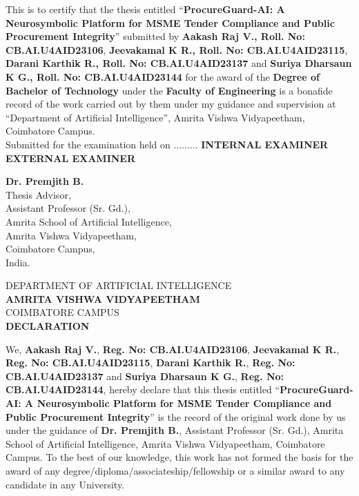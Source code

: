 \documentclass[a4paper, 12pt]{report}
\theoremstyle{definition}
\begin{document}
	\vspace*{.8cm}
	\noindent This is to certify that the thesis entitled \enquote{\textbf{ProcureGuard-AI: A Neurosymbolic Platform for MSME Tender Compliance and Public Procurement Integrity}} submitted by \textbf{Aakash Raj V., Roll. No: CB.AI.U4AID23106}, \textbf{Jeevakamal K R., Roll. No: CB.AI.U4AID23115}, \textbf{Darani Karthik R., Roll. No: CB.AI.U4AID23137} and \textbf{Suriya Dharsaun K G., Roll. No: CB.AI.U4AID23144} for the award of the \textbf{Degree of Bachelor of Technology} under the \textbf{Faculty of Engineering} is a bonafide record of the work carried out by them under my guidance and supervision at \enquote{Department of Artificial Intelligence}, Amrita Vishwa Vidyapeetham, Coimbatore Campus.\\
    \vfill
    Submitted for the examination held on .........
    \vfill
    \textbf{INTERNAL EXAMINER}    \hspace{5cm}      \textbf{EXTERNAL EXAMINER}
    \vfill
\begin{center}
		\textbf{Dr. Premjith B.}\\
	Thesis Advisor,\\
	Assistant Professor (Sr. Gd.),\\
	Amrita School of Artificial Intelligence,\\
	Amrita Vishwa Vidyapeetham,\\
	Coimbatore Campus,\\
	India.
\end{center}

	\newpage
	\begin{center}
	{\large DEPARTMENT OF ARTIFICIAL INTELLIGENCE}\\
	\Large{ \textbf{AMRITA VISHWA VIDYAPEETHAM}}\\
	{\large COIMBATORE CAMPUS}\\
		\vspace*{2.5cm}
		\large {\textbf{DECLARATION}}
		\vspace*{.3cm}
	\end{center}

	\noindent We, \textbf{Aakash Raj V.}, \textbf{Reg. No: CB.AI.U4AID23106}, \textbf{Jeevakamal K R.}, \textbf{Reg. No: CB.AI.U4AID23115}, \textbf{Darani Karthik R.}, \textbf{Reg. No: CB.AI.U4AID23137} and \textbf{Suriya Dharsaun K G.}, \textbf{Reg. No: CB.AI.U4AID23144}, hereby declare that this thesis entitled \enquote{\textbf{ProcureGuard-AI: A Neurosymbolic Platform for MSME Tender Compliance and Public Procurement Integrity}} is the record of the original work done by us under the guidance of \textbf{Dr. Premjith B.}, Assistant Professor (Sr. Gd.), Amrita School of Artificial Intelligence, Amrita Vishwa Vidyapeetham, Coimbatore Campus. To the best of our knowledge, this work has not formed the basis for the award of any degree/diploma/associateship/fellowship or a similar award to any candidate in any University.\\\\
\end{document}
